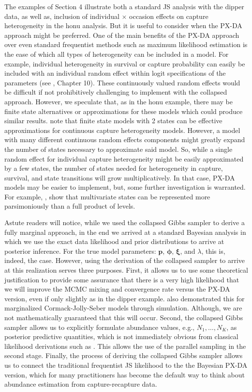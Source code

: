 \documentclass[12pt]{article}
\newcommand{\bp}{\ensuremath{\mathbf{p}}}
\newcommand{\bxi}{\ensuremath{\boldsymbol{\xi}}}
\newcommand{\bphi}{\ensuremath{\boldsymbol{\phi}}}
\begin{document}
The examples of Section 4 illustrate both a standard JS analysis with the dipper data, as well as, inclusion of individual $\times$ occasion effects on capture heterogeneity in the honu analysis. But it is useful to consider when the PX-DA approach might be preferred. One of the main benefits of the PX-DA approach over even standard frequentist methods such as maximum likelihood estimation is the ease of which all types of heterogeneity can be included in a model. For example, individual heterogeneity in survival or capture probability can easily be included with an individual random effect within logit specifications of the parameters (see \citealt{Royle:2008kx}, Chapter 10). These continuously valued random effects would be difficult if not prohibitively challenging to implement with the collapsed approach. However, we speculate that, as in the honu example, there may be finite state alternatives or approximations for these models which could produce similar results. \citet{Pledger:2010fk} note that finite state models with 2 states can be effective approximations for continuous capture heterogeneity models. However, a model with many different continuous random effects components might greatly expand the number of states necessary to approximate said model. So, while a single random effect for individual capture heterogeneity might be easily approximated by a few states, the number of states needed for heterogeneity in capture, survival, and state transitions will grow multiplicatively. In that case, PX-DA models may be easier to implement, but, some further investigation is warranted. For example, \citet{johnson2016multivariate}, show that multivariate states can be represented more parsimoniously than a full product of levels. 

Astute readers will notice, while we used the collapsed Gibbs sampler to derive a fully marginal approach, in the end we arrived at a standard Bayesian analysis in which we use the exact data likelihood and prior distributions to arrive at posterior inference. For the true model parameters: $\bp$, $\bphi$, $\bxi$, and $\lambda$, this is, indeed, the case. However, using the derivation of the collapsed sampler to arrive at this realization serves three purposes. First, it allows us to use some theoretical justification to provide some assurance that there is a very high likelihood that we will improve the MCMC mixing and convergence rate versus the PX-DA version, even if only slightly as in the dipper example. \cite{yackulic2020need} also demonstrated this for marginalized Cormack-Jolly-Seber models through simulation. Although, we are not mathematically guaranteed that this will occur. Second, the collapsed Gibbs sampler allows us to explicitly formulate abundance values, e.g., $N_1,\dots,N_K$, as posterior predictive quantities, which is not immediately obvious from classical likelihood derivations such as \cite{schwarz1996general}. This allows the use of the parallel sampling in the second stage. Finally, the process of deriving the collapsed Gibbs sampler allows us to connect the traditional frequentist JS likelihood to the the Bayesian PX-DA version, which for many practitioners has become the default way to think about abundance estimation from capture-recapture data. 
\end{document}
